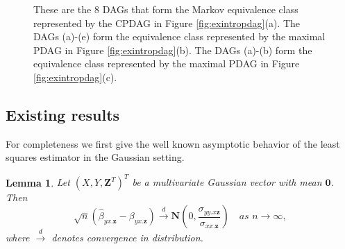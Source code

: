 \documentclass[11pt,a4paper]{article}
\newtheorem{Lemma}[Satz]{Lemma}
\theoremstyle{definition}
\theoremstyle{remark}
\newcommand{\mpdag}{maximal PDAG}
\begin{document}
\begin{figure}
{
	}
	\caption{These are the 8 DAGs that form the Markov equivalence class represented by the CPDAG in Figure \ref{fig:exintropdag}(a). The DAGs (a)-(e) form the equivalence class represented by the \mpdag{} in Figure \ref{fig:exintropdag}(b).
		The DAGs (a)-(b) form the equivalence class represented by the \mpdag{} in Figure \ref{fig:exintropdag}(c).}
	\label{fig:allDAGs}
\end{figure} 

\subsection{Existing results}

For completeness we first give the well known asymptotic behavior of the least squares estimator in the Gaussian setting. 


\begin{Lemma} \citep[Cf. Section 6.6.4 of][]{mardia1980multivariate}
	Let $(X,Y,\mathbf{Z}^{T})^{T}$ be a multivariate Gaussian vector with mean $\mathbf{0}$.
	Then 
	\[
	\sqrt{n}(\hat{\beta}_{yx.\mathbf{z}} - \beta_{yx.\mathbf{z}}) \xrightarrow{d} 
	\mathbf{N}\left( 0,\frac{\sigma_{yy.x\mathbf{z}}}
	{\sigma_{xx.\mathbf{z}}} \right) \quad \textit{as } n \rightarrow \infty,
	\] 
	where $\xrightarrow{d}$ denotes convergence in distribution.
	\label{avar.equ}
\end{Lemma}


\end{document}
